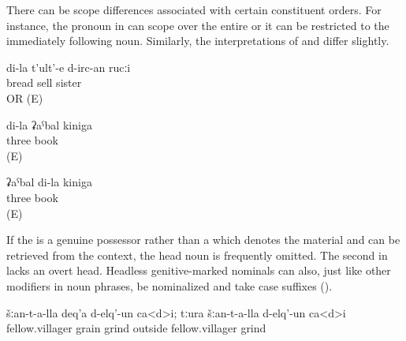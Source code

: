 There can be scope differences associated with certain constituent orders. For instance, the  pronoun in  can scope over the entire  or it can be restricted to the immediately following noun. Similarly, the interpretations of  and  differ slightly.
%
\begin{exe}
	\ex	\label{ex:‎‎‎my sister who sells bread}
	\gll	di-la	t'ult'-e	d-irc-an	rucːi\\
			bread	sell	sister\\
	\glt	{} OR  (E)

	\ex	\label{ex:ex:‎‎‎my three books ‎‎‎three books of mine}
	\begin{xlist}
		\ex	\label{ex:‎‎‎my three books ‎‎‎three books of mine@A}
		\gll	di-la	ʡaˁbal	kiniga\\
				three	book\\
		\glt	{} (E)
	
		\ex	\label{ex:‎‎‎my three books ‎‎‎three books of mine@B}
		\gll	ʡaˁbal	di-la	kiniga\\
			three		book\\
		\glt	{} (E)
	\end{xlist}
\end{exe}

If the  is a genuine possessor rather than a  which denotes the material and can be retrieved from the context, the head noun is frequently omitted. The second  in  lacks an overt head. Headless genitive-marked nominals can also, just like other modifiers in noun phrases, be nominalized and take case suffixes ().
%
\begin{exe}
	\ex	\label{ex:‎‎The villagers have milled their wheat; the people from other villages have milled (it)}
	\gll	šːan-t-a-lla	deq'a	d-elq'-un	ca<d>i;	tːura	šːan-t-a-lla	d-elq'-un	ca<d>i\\
		fellow.villager	grain	grind		outside	fellow.villager	grind	\\
	\glt	{}
\end{exe}


